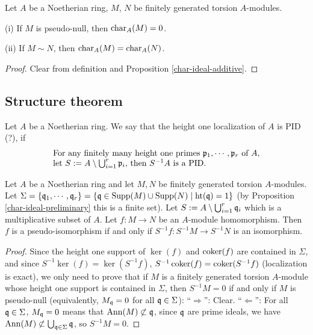 \begin{prop}
\label{pseudo-null-char-ideal}
Let $A$ be a Noetherian ring, $M$, $N$ be finitely generated torsion $A$-modules.

{\rm(i)} If $M$ is pseudo-null, then $\operatorname{char}_A(M)=0$.

{\rm(ii)} If $M\sim N$, then $\operatorname{char}_A(M)=\operatorname{char}_A(N)$.
\end{prop}

\begin{proof}
Clear from definition and Proposition \ref{char-ideal-additive}.
\end{proof}

\subsection{Structure theorem}

\begin{definition}
\label{ht-1-localization-is-PID}
Let $A$ be a Noetherian ring.
We say that the height one localization of $A$ is PID (?), if
\begin{equation}
\label{eqn:ht-1-localization-is-PID}
\begin{array}{l}
\text{For any finitely many height one primes ${\mathfrak{p}}_1,\cdots,{\mathfrak{p}}_r$ of $A$,}\\
\text{let $S:=A\setminus\bigcup_{i=1}^r{\mathfrak{p}}_i$, then $S^{-1}A$ is a PID.}
\end{array}
\end{equation}
\end{definition}

\begin{lem}
\label{pis-iff}
Let $A$ be a Noetherian ring and let
$M,N$ be finitely generated torsion $A$-modules.
Let $\Sigma=\{{\mathfrak{q}}_1,\cdots,{\mathfrak{q}}_r\}
=\{{\mathfrak{q}}\in{\mathrm{Supp}}(M)\cup{\mathrm{Supp}}(N)\mid{\mathrm{ht}}({\mathfrak{q}})=1\}$
(by Proposition \ref{char-ideal-preliminary} this is a finite set).
Let $S:=A\setminus\bigcup_{i=1}^r{\mathfrak{q}}_i$ which is a multiplicative subset of $A$.
Let $f:M\to N$ be an $A$-module homomorphism.
Then $f$ is a pseudo-isomorphism if and only if $S^{-1}f:S^{-1}M\to S^{-1}N$
is an isomorphism.
\end{lem}

\begin{proof}
Since the height one support of $\ker(f)$ and $\operatorname{coker}(f)$
are contained in $\Sigma$,
and since $S^{-1}\ker(f)=\ker(S^{-1}f)$,
$S^{-1}\operatorname{coker}(f)=\operatorname{coker}(S^{-1}f)$ (localization is exact),
we only need to prove that if $M$ is a finitely generated torsion $A$-module
whose height one support is contained in $\Sigma$,
then $S^{-1}M=0$ if and only if $M$ is pseudo-null (equivalently, $M_{\mathfrak{q}}=0$
for all ${\mathfrak{q}}\in\Sigma$):
``$\Rightarrow$'': Clear.
``$\Leftarrow$'': For all ${\mathfrak{q}}\in\Sigma$, $M_{\mathfrak{q}}=0$ means that ${\mathrm{Ann}}(M)\not\subset{\mathfrak{q}}$,
since ${\mathfrak{q}}$ are prime ideals, we have ${\mathrm{Ann}}(M)\not\subset\bigcup_{{\mathfrak{q}}\in\Sigma}{\mathfrak{q}}$,
so $S^{-1}M=0$.
\end{proof}

